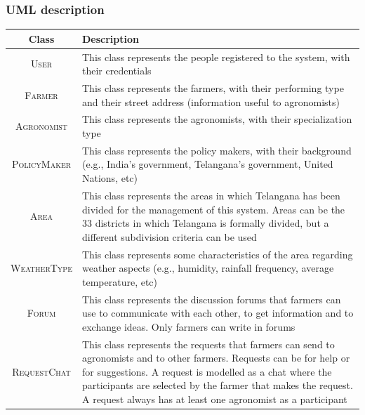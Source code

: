 \subsubsection*{UML description}
\begin{center}
    \setlength\arrayrulewidth{1pt}
    \begin{longtable}{|c|m{}|}
            
            \hline
            \rowcolor{myblue}\color{white}Class & \color{white}Description \\
            \hline
            
            \textsc{User}  &    This class represents the people registered to the system, with their credentials  \\
            \hline
            \textsc{Farmer}     &   This class represents the farmers, with their performing type and their street address (information useful to agronomists) \\
            \hline
            \textsc{Agronomist}  &    This class represents the agronomists, with their specialization type \\
            \hline
            \textsc{PolicyMaker}  &    This class represents the policy makers, with their background (e.g., India’s government, Telangana’s government, United Nations, etc)  \\
            \hline
            \textsc{Area}  &    This class represents the areas in which Telangana has been divided for the management of this system. Areas can be the 33 districts in which Telangana is formally divided, but a different subdivision criteria can be used  \\
            \hline
            \textsc{WeatherType}  &    This class represents some characteristics of the area regarding weather aspects (e.g., humidity, rainfall frequency, average temperature, etc)  \\
            \hline
            \textsc{Forum}  &    This class represents the discussion forums that farmers can use to communicate with each other, to get information and to exchange ideas. Only farmers can write in forums  \\
            \hline
            \textsc{RequestChat}  &    This class represents the requests that farmers can send to agronomists and to other farmers. Requests can be for help or for suggestions. A request is modelled as a chat where the participants are selected by the farmer that makes the request. A request always has at least one agronomist as a participant \\

\end{longtable}
\end{center}
